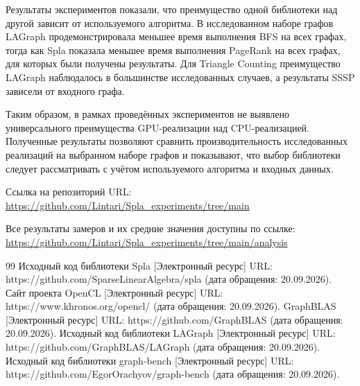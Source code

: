 \documentclass[a4paper]{article}
\begin{document}
Результаты экспериментов показали, что преимущество одной библиотеки над другой зависит от используемого алгоритма. В исследованном наборе графов LAGraph продемонстрировала меньшее время выполнения BFS на всех графах, тогда как Spla показала меньшее время выполнения PageRank на всех графах, для которых были получены результаты. Для Triangle Counting преимущество LAGraph наблюдалось в большинстве исследованных случаев, а результаты SSSP зависели от входного графа.

Таким образом, в рамках проведённых экспериментов не выявлено универсального преимущества GPU-реализации над CPU-реализацией. Полученные результаты позволяют сравнить производительность исследованных реализаций на выбранном наборе графов и показывают, что выбор библиотеки следует рассматривать с учётом используемого алгоритма и входных данных.

Ссылка на репозиторий URL: \url{https://github.com/Lintari/Spla_experiments/tree/main}

Все результаты замеров и их средние значения доступны по ссылке: \url{https://github.com/Lintari/Spla_experiments/tree/main/analysis}

\begin{thebibliography}{99}
 Исходный код библиотеки Spla [Электронный ресурс] URL: https://github.com/SparseLinearAlgebra/spla (дата обращения: 20.09.2026).
 Сайт проекта OpenCL [Электронный ресурс] URL: https://www.khronos.org/opencl/ (дата обращения: 20.09.2026).	
 GraphBLAS [Электронный ресурс] URL: https://github.com/GraphBLAS (дата обращения: 20.09.2026).
 Исходный код библиотеки LAGraph [Электронный ресурс] URL: https://github.com/GraphBLAS/LAGraph (дата обращения: 20.09.2026).
 Исходный код библиотеки graph-bench [Электронный ресурс] URL: https://github.com/EgorOrachyov/graph-bench (дата обращения: 20.09.2026).
\end{thebibliography}
\end{document}

